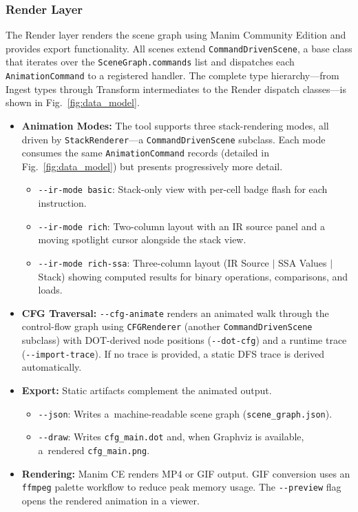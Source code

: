 \subsubsection{Render Layer}
The Render layer renders the scene graph using Manim Community Edition\cite{manimce} and provides export functionality. All scenes extend \texttt{CommandDrivenScene}, a base class that iterates over the \texttt{SceneGraph.commands} list and dispatches each \texttt{AnimationCommand} to a registered handler. The complete type hierarchy---from Ingest types through Transform intermediates to the Render dispatch classes---is shown in Fig.~\ref{fig:data_model}.

\begin{itemize}
    \item \textbf{Animation Modes:} The tool supports three stack-rendering modes, all driven by \texttt{StackRenderer}---a \texttt{CommandDrivenScene} subclass. Each mode consumes the same \texttt{AnimationCommand} records (detailed in Fig.~\ref{fig:data_model}) but presents progressively more detail.
    \begin{itemize}
        \item \texttt{-{}-ir-mode basic}: Stack-only view with per-cell badge flash for each instruction.
        \item \texttt{-{}-ir-mode rich}: Two-column layout with an IR source panel and a moving spotlight cursor alongside the stack view.
        \item \texttt{-{}-ir-mode rich-ssa}: Three-column layout (IR Source $\mid$ SSA Values $\mid$ Stack) showing computed results for binary operations, comparisons, and loads.
    \end{itemize}

    \item \textbf{CFG Traversal:} \texttt{-{}-cfg-animate} renders an animated walk through the control-flow graph using \texttt{CFGRenderer} (another \texttt{CommandDrivenScene} subclass) with DOT-derived node positions (\texttt{-{}-dot-cfg}) and a runtime trace (\texttt{-{}-import-trace}). If no trace is provided, a static DFS trace is derived automatically.

    \item \textbf{Export:} Static artifacts complement the animated output.
    \begin{itemize}
        \item \texttt{-{}-json}: Writes a~machine-readable scene graph (\texttt{scene\_graph.json}).
        \item \texttt{-{}-draw}: Writes \texttt{cfg\_main.dot} and, when Graphviz is available, a~rendered \texttt{cfg\_main.png}.
    \end{itemize}

    \item \textbf{Rendering:} Manim CE renders MP4 or GIF output. GIF conversion uses an \texttt{ffmpeg} palette workflow to reduce peak memory usage. The \texttt{-{}-preview} flag opens the rendered animation in a viewer.
\end{itemize}
